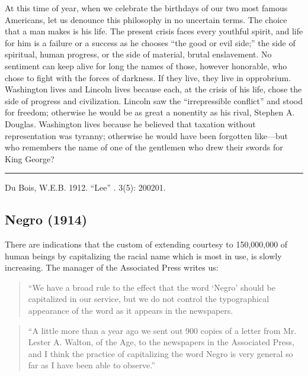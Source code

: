 \documentclass[letterpaper,10pt,english]{jupyterBook}
\begin{document}
\sphinxAtStartPar
At this time of year, when we celebrate the birthdays of our two most famous Americans, let us denounce this philosophy in no uncertain terms. The choice that a man makes is his life. The present crisis faces every youthful spirit, and life for him is a failure or a success as he chooses “the good or evil side;” the side of spiritual, human progress, or the side of material, brutal enslavement. No sentiment can keep alive for long the names of those, however honorable, who chose to fight with the forces of darkness. If they live, they live in opprobrium. Washington lives and Lincoln lives because each, at the crisis of his life, chose the side of progress and civilization. Lincoln saw the “irrepressible conflict” and stood for freedom; otherwise he would be as great a nonentity as his rival, Stephen A. Douglas. Washington lives because he believed that taxation without representation was tyranny; otherwise he would have been forgotten like—but who remembers the name of one of the gentlemen who drew their swords for King George?


\bigskip\hrule\bigskip


\sphinxAtStartPar
{} Du Bois, W.E.B. 1912. “Lee” . 3(5): 200\sphinxhyphen{}201.


\subsection{Negro (1914)}
\label{\detokenize{Volumes/09/02/negro:negro-1914}}\label{\detokenize{Volumes/09/02/negro::doc}}
\sphinxAtStartPar
There are indications that the custom of extending courtesy to 150,000,000 of human beings by capitalizing the racial name which is most in use, is slowly increasing. The manager of the  Associated Press writes us:
\begin{quote}

\sphinxAtStartPar
“We have a broad rule to the effect that the word ‘Negro’ should be capitalized in our service, but we do not control the typographical appearance of the word as it appears in the newspapers.
\end{quote}
\begin{quote}

\sphinxAtStartPar
“A little more than a year ago we sent out 900 copies of a letter from Mr. Lester A. Walton, of the Age, to the newspapers in the Associated Press, and I think the practice of capitalizing the word Negro is very general so far as I have been able to observe.”
\end{quote}
\end{document}
